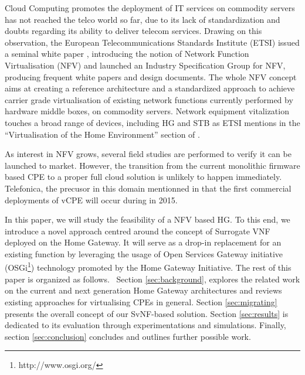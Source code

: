 Cloud Computing promotes the deployment of IT services on commodity servers has not reached the telco world so far, due to its lack of standardization and doubts regarding its ability to deliver telecom services. 
Drawing on this observation, the European Telecommunications Standards Institute (ETSI) issued a seminal white paper \cite{_network_2012}, introducing the notion of Network Function Virtualisation (NFV) and launched an Industry Specification Group for NFV, producing frequent white papers and design documents.
The whole NFV concept aims at creating a reference architecture and a standardized approach to achieve carrier grade virtualisation of existing network functions currently performed by hardware middle boxes, on commodity servers.
Network equipment vitalization touches a broad range of devices, including HG and STB as ETSI mentions in the “Virtualisation of the Home Environment” section of \cite{_network_2013}. 

As interest in NFV grows, several field studies are performed to verify it can be launched to market.
However, the transition from the current monolithic firmware based CPE to a proper full cloud solution is unlikely to happen immediately. Telefonica, the precusor in this domain mentionned in \cite{enrique_blanco_telefonica_2015} that the first commercial deployments of vCPE will occur during in 2015.

In this paper, we will study the feasibility of a NFV based HG.  To this end, we introduce a novel  approach centred around the concept of Surrogate VNF deployed on the Home Gateway.
It will serve as a drop-in replacement for an existing function by leveraging the usage of Open Services Gateway initiative (OSGi\footnote{http://www.osgi.org/}) technology promoted by the Home Gateway Initiative.
The rest of this paper is organized as follows.
~Section \ref{sec:background}, explores the related work on the current and next generation Home Gateway architectures and reviews existing approaches for virtualising CPEs in general.
Section \ref{sec:migrating} presents the overall concept of our SvNF-based solution. Section \ref{sec:results} is dedicated to its evaluation through experimentations and simulations. Finally, section \ref{sec:conclusion} concludes and outlines further possible work.


